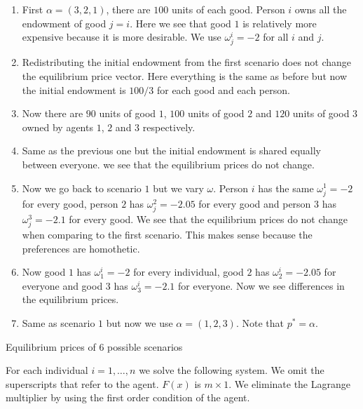 \documentclass[a4paper,12pt]{article}
\begin{document}
    
    \begin{enumerate}
        \item First $\alpha = (3,2,1)$, there are $100$ units of each good. Person $i$ owns all the endowment of good $j=i$. Here we see that good $1$ is relatively more expensive because it is more desirable. We use $\omega_j^i=-2$ for all $i$ and $j$. 
        \item Redistributing the initial endowment from the first scenario does not change the equilibrium price vector. Here everything is the same as before but now the initial endowment is $100/3$ for each good and each person. 
        \item Now there are $90$ units of good $1$, $100$ units of good $2$ and $120$ units of good $3$ owned by agents $1$, $2$ and $3$ respectively. 
        \item Same as the previous one but the initial endowment is shared equally between everyone. we see that the equilibrium prices do not change.  
        \item Now we go back to scenario $1$ but we vary $\omega$. Person $i$ has the same $\omega_j^1 = -2$ for every good, person $2$ has $\omega_j^2 = -2.05$ for every good and person $3$ has $\omega_j^3 = -2.1$ for every good. We see that the equilibrium prices do not change when comparing to the first scenario. This makes sense because the preferences are homothetic. 
        \item Now good $1$ has $\omega_1^i=-2$ for every individual, good $2$ has $\omega_2^i=-2.05$ for everyone and good $3$ has $\omega_3^i=-2.1$ for everyone. Now we see differences in the equilibrium prices. 
        
        \item Same as scenario $1$ but now we use $\alpha = (1,2,3)$. Note that $p^* = \alpha$. 
    \end{enumerate}
    
    
        \begin{table}[!htbp]
            \centering
            \caption[Short Caption for LoT]{Equilibrium prices of $6$ possible scenarios}\label{table_ex5}
        \end{table}
        
        
    For each individual $i=1,\dots, n$ we solve the following system. We omit the superscripts that refer to the agent. $F(x)$ is $m\times 1$. We eliminate the Lagrange multiplier by using the first order condition of the agent. 
\end{document}
